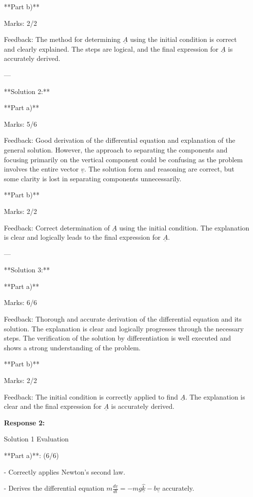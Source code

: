 \documentclass[a4paper,11pt]{article}
\begin{document}
**Part b)**

Marks: 2/2

Feedback: The method for determining \(\underline{A}\) using the initial condition is correct and clearly explained. The steps are logical, and the final expression for \(\underline{A}\) is accurately derived.

---

**Solution 2:**

**Part a)**

Marks: 5/6

Feedback: Good derivation of the differential equation and explanation of the general solution. However, the approach to separating the components and focusing primarily on the vertical component could be confusing as the problem involves the entire vector \(\underline{v}\). The solution form and reasoning are correct, but some clarity is lost in separating components unnecessarily.

**Part b)**

Marks: 2/2

Feedback: Correct determination of \(\underline{A}\) using the initial condition. The explanation is clear and logically leads to the final expression for \(\underline{A}\).

---

**Solution 3:**

**Part a)**

Marks: 6/6

Feedback: Thorough and accurate derivation of the differential equation and its solution. The explanation is clear and logically progresses through the necessary steps. The verification of the solution by differentiation is well executed and shows a strong understanding of the problem.

**Part b)**

Marks: 2/2

Feedback: The initial condition is correctly applied to find \(\underline{A}\). The explanation is clear and the final expression for \(\underline{A}\) is accurately derived.

\bigskip
\textbf{Response 2:}

Solution 1 Evaluation

**Part a)**: (6/6)

- Correctly applies Newton's second law.

- Derives the differential equation \( m\frac{d\underline{v}}{dt} = -mg \hat{\underline{k}} - b\underline{v} \) accurately.
\end{document}
